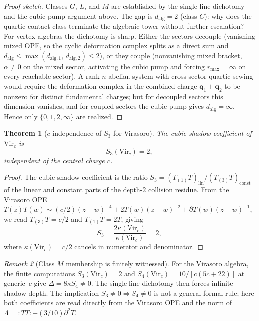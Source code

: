 \documentclass[11pt]{article}
\newtheorem{theorem}{Theorem}[section]
\theoremstyle{definition}
\theoremstyle{remark}
\newtheorem{remark}[theorem]{Remark}
\newcommand{\Vir}{\mathrm{Vir}}
\numberwithin{equation}{section}
\begin{document}
\begin{proof}[Proof sketch]
Classes $G$, $L$, and $M$ are established by the single-line
dichotomy and the cubic pump argument above.
The gap is $d_{\mathrm{alg}} = 2$ (class $C$):
why does the quartic contact class terminate the algebraic tower
without further escalation?
For vertex algebras the dichotomy is sharp.
Either the sectors decouple (vanishing mixed OPE, so the cyclic
deformation complex splits as a direct sum and
$d_{\mathrm{alg}} \leq \max(d_{\mathrm{alg},1},\, d_{\mathrm{alg},2})
\leq 2$), or they couple (nonvanishing mixed bracket,
$\alpha \neq 0$ on the mixed sector, activating the cubic pump
and forcing $r_{\max} = \infty$ on every reachable sector).
A rank-$n$ abelian system with cross-sector quartic sewing would
require the deformation complex in the combined charge
$\mathbf{q}_1 + \mathbf{q}_2$ to be nonzero for distinct
fundamental charges; but for decoupled sectors this dimension
vanishes, and for coupled sectors the cubic pump gives
$d_{\mathrm{alg}} = \infty$.
Hence only $\{0, 1, 2, \infty\}$ are realized.
\end{proof}

\begin{theorem}[$c$-independence of $S_3$ for Virasoro]
\label{thm:s3-vir}
The cubic shadow coefficient of $\Vir_c$ is
\begin{equation}\label{eq:s3-vir}
S_3(\Vir_c) = 2,
\end{equation}
independent of the central charge $c$.
\end{theorem}

\begin{proof}
The cubic shadow coefficient is the ratio $S_3 = (T_{(1)}T)_{\mathrm{lin}} / (T_{(3)}T)_{\mathrm{const}}$
of the linear and constant parts of the depth-$2$ collision residue.
From the Virasoro OPE
$T(z)T(w) \sim (c/2)(z-w)^{-4} + 2T(w)(z-w)^{-2} + \partial T(w)(z-w)^{-1}$,
we read $T_{(3)}T = c/2$ and $T_{(1)}T = 2T$, giving
\[
S_3 = \frac{2\kappa(\Vir_c)}{\kappa(\Vir_c)} = 2,
\]
where $\kappa(\Vir_c) = c/2$ cancels in numerator and denominator.
\end{proof}

\begin{remark}[Class $M$ membership is finitely witnessed]
\label{rem:finite-cert}
For the Virasoro algebra, the finite computations
$S_3(\Vir_c)=2$ and
$S_4(\Vir_c)=10/[c(5c+22)]$ at generic~$c$ give
$\Delta=8\kappa S_4\neq0$. The single-line dichotomy then forces
infinite shadow depth. The implication $S_3\neq0\Rightarrow S_4\neq0$
is not a general formal rule; here both coefficients are read directly
from the Virasoro OPE and the norm of
$\Lambda={:}TT{:}-(3/10)\partial^2T$.
\end{remark}
\end{document}
